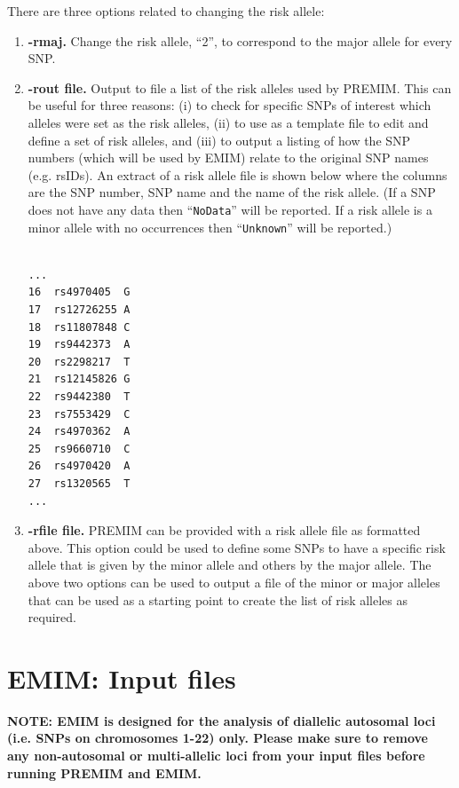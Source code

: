 \documentclass[a4paper,12pt]{article}
\newcommand{\code}[1]{{\footnotesize{{\tt #1}}}}
\begin{document}
There are three options related to changing the risk allele: 
\begin{enumerate}

\item {\bf -rmaj.} Change the risk allele, ``2'', to correspond to the major allele for every SNP. 
\item {\bf -rout file.} Output to file a list of the risk alleles used by PREMIM. This can be useful for three reasons: (i) to check for specific SNPs of interest which alleles were set as the risk alleles, (ii) to use as a template file to edit and define a set of risk alleles, and (iii) to output a listing of how the SNP numbers (which will be used by EMIM) relate to the original SNP names (e.g. rsIDs). An extract of a risk allele file is shown below where the columns are the SNP number, SNP name and the name of the risk allele. (If a SNP does not have any data then ``\code{NoData}'' will be reported. If a risk allele is a minor allele with no occurrences then ``\code{Unknown}'' will be reported.) \vspace{0.35cm} \begin{lstlisting}

...
16  rs4970405  G
17  rs12726255 A
18  rs11807848 C
19  rs9442373  A
20  rs2298217  T
21  rs12145826 G
22  rs9442380  T
23  rs7553429  C
24  rs4970362  A
25  rs9660710  C
26  rs4970420  A
27  rs1320565  T
...

\end{lstlisting} \vspace{0.35cm}
\item {\bf -rfile file.} PREMIM can be provided with a risk allele file as formatted above. This option could be used to define some SNPs to have a specific risk allele that is given by the minor allele and others by the major allele. The above two options can be used to output a file of the minor or major alleles that can be used as a starting point to create the list of risk alleles as required.\end{enumerate}




\section{EMIM: Input files}
\label{emim}

{\bf NOTE: EMIM is designed for the analysis of diallelic autosomal loci (i.e. SNPs on chromosomes 1-22) only. Please make sure to remove any non-autosomal or multi-allelic loci from your input files before running PREMIM and EMIM.} 
\end{document}
